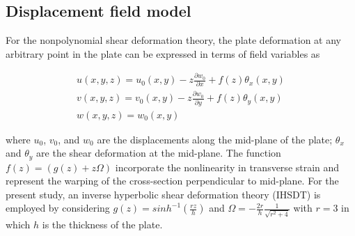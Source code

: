 \documentclass[3p,preprint,12pt]{elsarticle}
\begin{document}
\subsection{Displacement field model}	
For the nonpolynomial shear deformation theory, the plate deformation at any arbitrary point in the plate can be expressed in terms of field variables as

\begin{equation} 	\label{eq:DisplacementModelNPSDT}
\begin{gathered}
u\left(x,y,z\right)=u_{0}\left(x,y\right)-z\frac{\partial w_{0}}{\partial x}+f\left(z\right)\theta_{x}\left(x,y\right)\\
v\left(x,y,z\right)=v_{0}\left(x,y\right)-z\frac{\partial w_{0}}{\partial y}+f\left(z\right)\theta_{y}\left(x,y\right)\\
w\left(x,y,z\right)=w_{0}\left(x,y\right)
\end{gathered}
\end{equation}

where $u_{0}$, $v_{0}$, and $w_{0}$ are the displacements along the mid-plane of the plate; $\theta_{x}$ and $\theta_{y}$ are the shear deformation	at the mid-plane. The function $f\left(z\right) = \left(g\left(z\right)+z\Omega\right)$ incorporate the nonlinearity in transverse strain and represent the warping	of the cross-section perpendicular to mid-plane. For the present study, an inverse hyperbolic shear deformation theory (IHSDT) \cite{grover2013new} is employed by considering $g\left(z\right) = sinh^{-1}\left(\frac{rz}{h}\right)$ and $\Omega = -\frac{2r}{h} \frac{1}{\sqrt{r^{2} + 4}} $ with $r = 3$ in which $h$ is the thickness of the plate.
\end{document}
